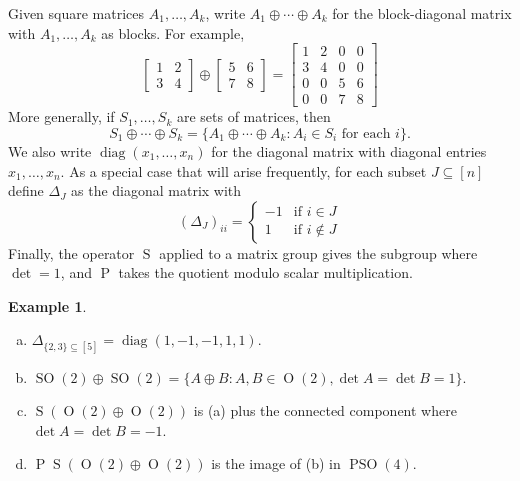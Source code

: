 \documentclass[reqno]{amsart}
\theoremstyle{definition} \newtheorem{example}[theorem]{Example}
\newcommand{\SO}{\operatorname{SO}}
\newcommand{\PSO}{\operatorname{PSO}}
\renewcommand{\O}{\operatorname{O}}
\newcommand{\diag}{\operatorname{diag}}
\renewcommand{\P}{\operatorname{P}}
\renewcommand{\S}{\operatorname{S}}
\begin{document}
Given square matrices $A_1, \ldots, A_k$, write $A_1 \oplus \cdots \oplus A_k$ for the block-diagonal matrix with $A_1, \ldots, A_k$ as blocks. For example,
\begin{equation*}
\begin{bmatrix} 1 & 2 \\ 3 & 4 \end{bmatrix} \oplus \begin{bmatrix} 5 & 6 \\ 7 & 8 \end{bmatrix} = \begin{bmatrix} 1 & 2 & 0 & 0 \\ 3 & 4 & 0 & 0 \\ 0 & 0 & 5 & 6 \\ 0 & 0 & 7 & 8 \end{bmatrix} 
\end{equation*}
More generally, if $S_1, \ldots, S_k$ are sets of matrices, then
\begin{equation*}
S_1 \oplus \cdots \oplus S_k = \{A_1 \oplus \cdots \oplus A_k : A_i \in S_i \text{ for each $i$}\}.
\end{equation*}
We also write $\diag(x_1,\ldots,x_n)$ for the diagonal matrix with diagonal entries $x_1,\ldots,x_n$. As a special case that will arise frequently, for each subset $J \subseteq [n]$ define $\Delta_{J}$ as the diagonal matrix with
\begin{equation*}
(\Delta_J)_{ii} = \begin{cases} -1 & \text{if $i \in J$} \\
						   1 & \text{if $i \notin J$} \end{cases}
\end{equation*}
Finally, the operator $\S$ applied to a matrix group gives the subgroup where $\det = 1$, and $\P$ takes the quotient modulo scalar multiplication. 

\begin{example} \hfill
\begin{enumerate}[(a)]
\item $\Delta_{\{2,3\} \subseteq [5]} = \diag(1,-1,-1,1,1)$.
\item $\SO(2) \oplus \SO(2) = \{A \oplus B : A,B \in \O(2), \det A = \det B = 1\}$.
\item $\S(\O(2) \oplus \O(2))$ is (a) plus the connected component where $\det A = \det B = -1$.
\item $\P\S(\O(2) \oplus \O(2))$ is the image of (b) in $\PSO(4)$.
\end{enumerate}
\end{example}
\end{document}
